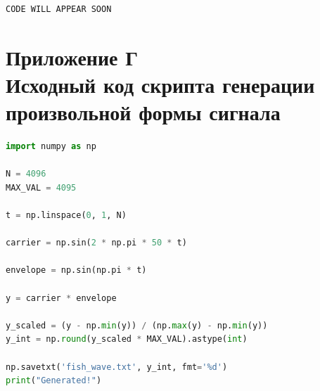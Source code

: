 \documentclass[12pt,a4paper,TimesNewRoman]{article}
\begin{document}
\begin{lstlisting}[language=Verilog, frame=none,caption={Контроллер передачи данных на ЦАП Pmod DA2 (dac\_driver.sv)}]
    CODE WILL APPEAR SOON
\end{lstlisting}

\newpage
\section*{Приложение Г \\ Исходный код скрипта генерации произвольной формы сигнала}

\begin{lstlisting}[language=Python, frame=none,caption={Скрипт генерации массива отсчетов для BRAM (AWG\_gen.py)}]
import numpy as np

N = 4096
MAX_VAL = 4095

t = np.linspace(0, 1, N)

carrier = np.sin(2 * np.pi * 50 * t)

envelope = np.sin(np.pi * t) 

y = carrier * envelope

y_scaled = (y - np.min(y)) / (np.max(y) - np.min(y))
y_int = np.round(y_scaled * MAX_VAL).astype(int)

np.savetxt('fish_wave.txt', y_int, fmt='%d')
print("Generated!")
\end{lstlisting}
\end{document}
